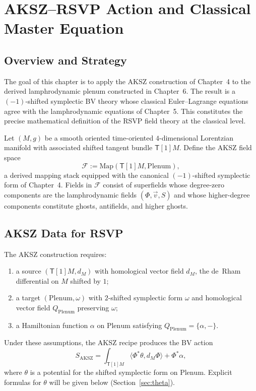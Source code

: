 \chapter{AKSZ--RSVP Action and Classical Master Equation}

\section{Overview and Strategy}

The goal of this chapter is to apply the AKSZ construction of
Chapter~4 to the derived lamphrodynamic plenum constructed in
Chapter~6. The result is a $(-1)$-shifted symplectic BV theory whose
classical Euler--Lagrange equations agree with the lamphrodynamic
equations of Chapter~5. This constitutes the precise mathematical
definition of the RSVP field theory at the classical level.

Let $(M,g)$ be a smooth oriented time-oriented $4$-dimensional Lorentzian
manifold with associated shifted tangent bundle $\mathsf{T}[1]M$.
Define the AKSZ field space
\[
\mathcal{F} := \mathrm{Map}(\mathsf{T}[1]M,\mathrm{Plenum}),
\]
a derived mapping stack equipped with the canonical $(-1)$-shifted
symplectic form of Chapter~4.
Fields in $\mathcal{F}$ consist of superfields whose degree-zero
components are the lamphrodynamic fields $(\Phi,\vec v,S)$ and whose
higher-degree components constitute ghosts, antifields, and higher
ghosts.


\section{AKSZ Data for RSVP}

The AKSZ construction requires:

\begin{enumerate}
\item a source $(\mathsf{T}[1]M,d_M)$ with homological vector field
$d_M$, the de~Rham differential on $M$ shifted by $1$;
\item a target $(\mathrm{Plenum},\omega)$ with $2$-shifted symplectic
form $\omega$ and homological vector field $Q_{\mathrm{Plenum}}$
preserving $\omega$;
\item a Hamiltonian function $\alpha$ on $\mathrm{Plenum}$ satisfying
$Q_{\mathrm{Plenum}}=\{\alpha,-\}$.
\end{enumerate}

Under these assumptions, the AKSZ recipe produces the BV action
\[
S_{\mathrm{AKSZ}} = \int_{\mathsf{T}[1]M}
\langle \Phi^{\ast}\theta, d_M\Phi\rangle + \Phi^{\ast}\alpha,
\]
where $\theta$ is a potential for the shifted symplectic form on
$\mathrm{Plenum}$.
Explicit formulas for $\theta$ will be given below (Section~\ref{sec:theta}).


